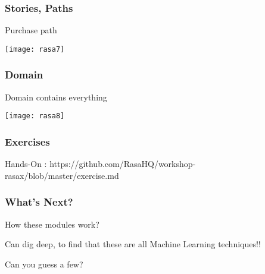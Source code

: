 \begin{frame}[fragile]\frametitle{Stories, Paths}

Purchase path

\begin{center}
\texttt{[image: rasa7]}
\end{center}



\end{frame}

\begin{frame}[fragile]\frametitle{Domain}

Domain contains everything

\begin{center}
\texttt{[image: rasa8]}
\end{center}



\end{frame}

\begin{frame}[fragile]\frametitle{Exercises}
Hands-On : https://github.com/RasaHQ/workshop-rasax/blob/master/exercise.md

\end{frame}

\begin{frame}[fragile]\frametitle{What's Next?}
How these modules work? 

Can dig deep, to find that these are all Machine Learning techniques!!

Can you guess a few?

\end{frame}
